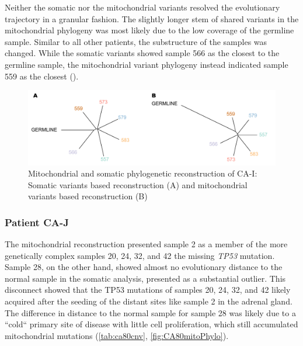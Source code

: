 Neither the somatic  nor the mitochondrial variants resolved the evolutionary trajectory in a granular fashion. The slightly longer stem of shared variants in the mitochondrial phylogeny was most likely due to the low coverage of the germline sample. Similar to all other patients, the substructure of the samples was changed. While  the somatic variants showed sample 566 as the closest to the germline sample, the mitochondrial variant phylogeny instead indicated sample 559 as the closest ().


\begin{figure}[ht]
\centering
\includegraphics[width=.99\linewidth]{Figures/CASCADE/mito/CA51SomVsMitoPhylo.pdf}
\caption[Mitochondrial and somatic phylogenetic reconstruction of CA-I]{Mitochondrial and somatic phylogenetic reconstruction of CA-I: Somatic variants based reconstruction (A) and mitochondrial variants based reconstruction (B)} \label{fig:CA51mitoPhylo}
\end{figure}


\subsubsection{Patient CA-J}

The mitochondrial reconstruction presented sample 2 as a member of the more genetically complex samples 20, 24, 32, and 42  the missing \textit{TP53} mutation. Sample 28, on the other hand, showed almost no evolutionary distance to the normal sample in the somatic analysis,  presented as a substantial outlier. This disconnect showed that the TP53 mutations of samples 20, 24, 32, and 42  likely acquired after the seeding of the distant sites like sample 2 in the adrenal gland. The difference in distance to the normal sample for sample 28 was likely due to a ``cold`` primary site of disease with little cell proliferation, which still accumulated mitochondrial mutations \cite{Abascal2021} (\autoref{tab:ca80cnv}, \autoref{fig:CA80mitoPhylo}).


